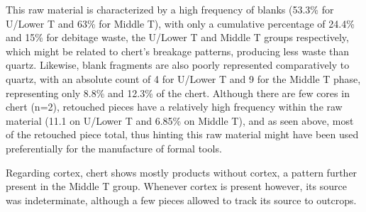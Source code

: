 \documentclass[12pt,twoside]{reedthesis}
\begin{document}
This raw material is characterized by a high frequency of blanks (53.3\% for U/Lower T and 63\% for Middle T), with only a cumulative percentage of 24.4\% and 15\% for debitage waste, the U/Lower T and Middle T groups respectively, which might be related to chert's breakage patterns, producing less waste than quartz. Likewise, blank fragments are also poorly represented comparatively to quartz, with an absolute count of 4 for U/Lower T and 9 for the Middle T phase, representing only 8.8\% and 12.3\% of the chert. Although there are few cores in chert (n=2), retouched pieces have a relatively high frequency within the raw material (11.1 on U/Lower T and 6.85\% on Middle T), and as seen above, most of the retouched piece total, thus hinting this raw material might have been used preferentially for the manufacture of formal tools.

Regarding cortex, chert shows mostly products without cortex, a pattern further present in the Middle T group. Whenever cortex is present however, its source was indeterminate, although a few pieces allowed to track its source to outcrops.
\end{document}
